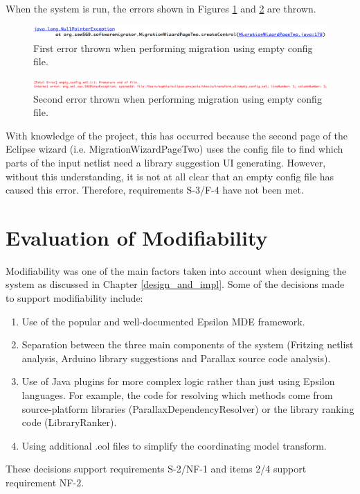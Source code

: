 \documentclass{UoYCSproject}
\begin{document}
When the system is run, the errors shown in Figures \ref{fig:cs3_output_1} and \ref{fig:cs3_output_2} are thrown. 
\begin{figure}[h!]
  \centering
  \includegraphics[width=1\linewidth]{graphics/cs3_output_1.png}
  \caption{First error thrown when performing migration using empty config file.}
  \label{fig:cs3_output_1}
\end{figure}
\begin{figure}[h!]
  \centering
  \includegraphics[width=1\linewidth]{graphics/cs3_output_2.png}
  \caption{Second error thrown when performing migration using empty config file.}
  \label{fig:cs3_output_2}
\end{figure}

With knowledge of the project, this has occurred because the second page of the Eclipse wizard (i.e. MigrationWizardPageTwo) uses the config file to find which parts of the input netlist need a library suggestion UI generating. However, without this understanding, it is not at all clear that an empty config file has caused this error. Therefore, requirements S-3/F-4 have not been met. 

\section{Evaluation of Modifiability} \label{eval_modifiability}
Modifiability was one of the main factors taken into account when designing the system as discussed in Chapter \ref{design_and_impl}. Some of the decisions made to support modifiability include:
\begin{enumerate}
\item Use of the popular and well-documented Epsilon MDE framework.
\item Separation between the three main components of the system (Fritzing netlist analysis, Arduino library suggestions and Parallax source code analysis).
\item Use of Java plugins for more complex logic rather than just using Epsilon languages. For example, the code for resolving which methods come from source-platform libraries (ParallaxDependencyResolver) or the library ranking code (LibraryRanker).
\item Using additional .eol files to simplify the coordinating model transform.
\end{enumerate}
These decisions support requirements S-2/NF-1 and items 2/4 support requirement NF-2. 
\end{document}
